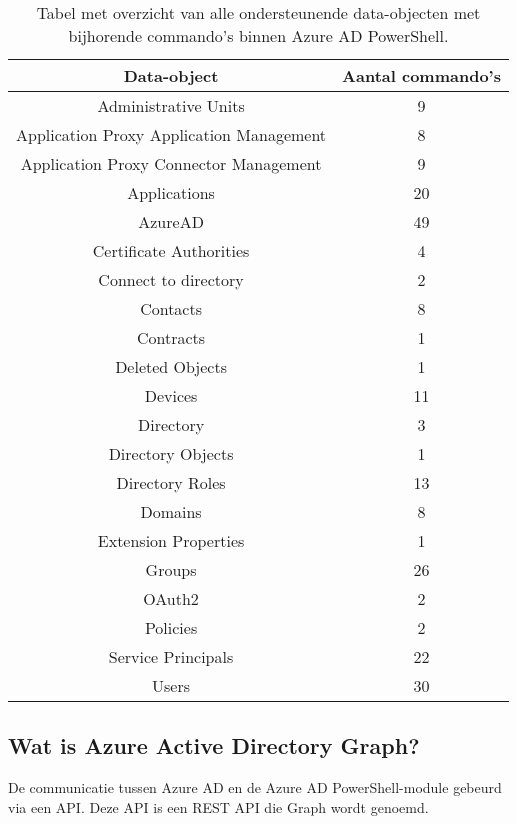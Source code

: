 \begin{table}
    \small
    \centering
    \begin{tabular}{ |c|c| } 
        \hline
        \textbf{Data-object} & \textbf{Aantal commando's} \\
        \hline
        Administrative Units & 9 \\ 
        Application Proxy Application Management & 8 \\ 
        Application Proxy Connector Management & 9 \\
        Applications & 20 \\ 
        AzureAD & 49 \\ 
        Certificate Authorities & 4 \\ 
        Connect to directory & 2 \\ 
        Contacts & 8 \\ 
        Contracts & 1 \\ 
        Deleted Objects & 1 \\ 
        Devices & 11 \\    
        Directory & 3 \\
        Directory Objects & 1 \\ 
        Directory Roles & 13 \\ 
        Domains & 8 \\ 
        Extension Properties & 1 \\ 
        Groups & 26 \\ 
        OAuth2 & 2 \\ 
        Policies & 2 \\ 
        Service Principals & 22 \\ 
        Users & 30 \\ 
        \hline
    \end{tabular}
    \caption[Tabel Azure AD data-objecten]{Tabel met overzicht van alle ondersteunende data-objecten met bijhorende commando's binnen Azure \ac{AD} PowerShell.}
    \label{AADT}
\end{table}

\subsection{Wat is Azure Active Directory Graph?}

De communicatie tussen Azure \ac{AD} en de Azure \ac{AD} PowerShell-module gebeurd via een \ac{API}. Deze \ac{API} is een \ac{REST} \ac{API} die Graph wordt genoemd. \\ 

